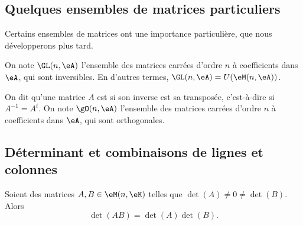 \subsection{Quelques ensembles de matrices particuliers}
Certains ensembles de matrices ont une importance particulière, que nous développerons plus tard.

\begin{definition}
	On note \( \GL(n,\eA) \) l'ensemble des matrices carrées d'ordre \( n \) à coefficients dans \( \eA \), qui sont inversibles. En d'autres termes, \( \GL(n,\eA) = U (\eM (n,\eA) ) \).
\end{definition}

\begin{definition}\label{DefMatriceOrthogonale}
	On dit qu'une matrice \( A \) est  si son inverse est sa transposée, c'est-à-dire si \( A^{-1} = A^t \). On note \( \gO(n,\eA) \) l'ensemble des matrices carrées d'ordre \( n \) à coefficients dans \( \eA \), qui sont orthogonales.
\end{definition}

\subsection{Déterminant et combinaisons de lignes et colonnes}
\label{SUBSECooKMSVooBBHwkH}

\begin{proposition}     \label{PROPooUCZVooPkloQp}
	Soient des matrices \( A,B\in \eM(n,\eK)\) telles que \( \det(A)\neq 0\neq \det(B)\). Alors
	\begin{equation}
		\det(AB)=\det(A)\det(B).
	\end{equation}
\end{proposition}

